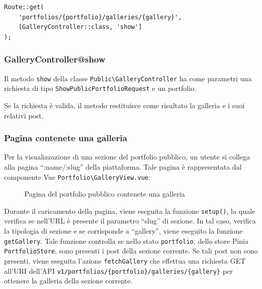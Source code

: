 \begin{lstlisting}[caption={Route ottenere la una galleria di un portfolio pubblico}, label={lst:route_public_portfolio_gallery}]
Route::get(
	'portfolios/{portfolio}/galleries/{gallery}',
	[GalleryController::class, 'show']
);
\end{lstlisting}

\subsubsection{GalleryController@show}
Il metodo \verb|show| della classe \verb|Public\GalleryController| ha come parametri una richiesta di tipo \verb|ShowPublicPortfolioRequest| e un portfolio.

Se la richiesta \`e valida, il metodo restituisce come risultato la galleria e i suoi relativi post. 

\subsubsection{Pagina contenete una galleria}
Per la visualizzazione di una sezione del portfolio pubblico, un utente si collega alla pagina ``:name/:slug'' della piattaforma. Tale pagina \`e rappresentata dal componente Vue \verb|Portfolio\GalleryView.vue|:
\begin{figure}[htbp]
	\centering
	\fboxsep=0.5pt
	\fboxrule=0.5pt
	\caption{Pagina del portfolio pubblico contenete una galleria}
	\label{fig:p-g-view}
\end{figure}


Durante il caricamento della pagina, viene eseguita la funzione \verb|setup()|, la quale verifica se nell'URL \`e presente il parametro ``slug'' di sezione. In tal caso, verifica la tipologia di sezione e se corrisponde a ``gallery'', viene eseguito la funzione \verb|getGallery|. Tale funzione controlla se nello stato \verb|portfolio|, dello store Pinia \verb|PortfolioStore|, sono presenti i post della sezione corrente. Se tali post non sono presenti, viene eseguita l'azione \verb|fetchGallery| che effettua una richiesta GET all'URI dell'API \verb|v1/portfolios/{portfolio}/galleries/{gallery}| per ottenere la galleria della sezione corrente.

